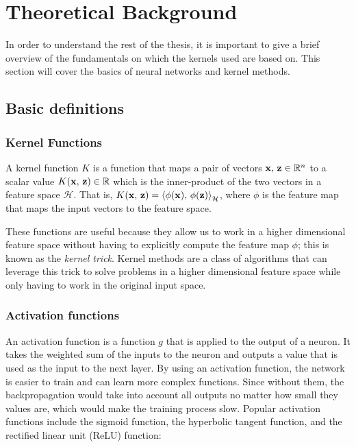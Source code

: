 \chapter{Theoretical Background}%
\label{sec:theoretical_background}

In order to understand the rest of the thesis, it is important to give a brief
overview of the fundamentals on which the kernels used are based on. This
section will cover the basics of neural networks and kernel methods.

\section{Basic definitions}

\subsection{Kernel Functions}%

A kernel function $K$ is a function that maps a pair of vectors $\mathbf{x},\,\mathbf{z} \in
    \mathbb{R}^n$ to a scalar value $K(\mathbf{x},\,\mathbf{z}) \in \mathbb{R}$ which is the
inner-product of the two vectors in a feature space $\mathcal{H}$. That is,
$K(\mathbf{x},\,\mathbf{z}) = \left\langle \phi(\mathbf{x}),\,\phi(\mathbf{z}) \right\rangle_{\mathcal{H}}$,
where $\phi$ is the feature map that maps the input vectors to the feature
space.


These functions are useful because they allow us to work in a higher dimensional
feature space without having to explicitly compute the feature map $\phi$; this
is known as the \emph{kernel trick}. Kernel methods are a class of algorithms
that can leverage this trick to solve problems in a higher dimensional feature
space while only having to work in the original input space.

\subsection{Activation functions}

An activation function is a function $g$ that is applied to the output of a
neuron. It takes the weighted sum of the inputs to the neuron and outputs a
value that is used as the input to the next layer. By using an activation
function, the network is easier to train and can learn more complex functions.
Since without them, the backpropagation would take into account all outputs no
matter how small they values are, which would make the training process slow.
Popular activation functions include the sigmoid function, the hyperbolic
tangent function, and the rectified linear unit (ReLU) function:

